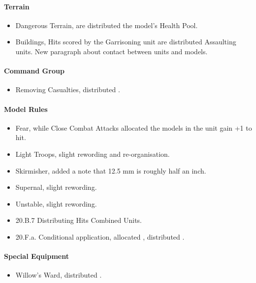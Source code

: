 \paragraph{Terrain}
\begin{itemize}[label={-}]
\item Dangerous Terrain, are distributed  the model's Health Pool.
\item Buildings, Hits scored by the Garrisoning unit are distributed  Assaulting units. New paragraph about contact between units and models.
\end{itemize}

\paragraph{Command Group}
\begin{itemize}[label={-}]
\item Removing Casualties, distributed .
\end{itemize}

\paragraph{Model Rules}
\begin{itemize}[label={-}]
\item Fear, while Close Combat Attacks allocated  the models in the unit gain +1 to hit.
\item Light Troops, slight rewording and re-organisation.
\item Skirmisher, added a note that 12.5 mm is roughly half an inch.
\item Supernal, slight rewording.
\item Unstable, slight rewording.
\item 20.B.7 Distributing Hits  Combined Units.
\item 20.F.a. Conditional application, allocated , distributed .
\end{itemize}

\paragraph{Special Equipment}
\begin{itemize}[label={-}]
\item Willow's Ward, distributed .
\end{itemize}